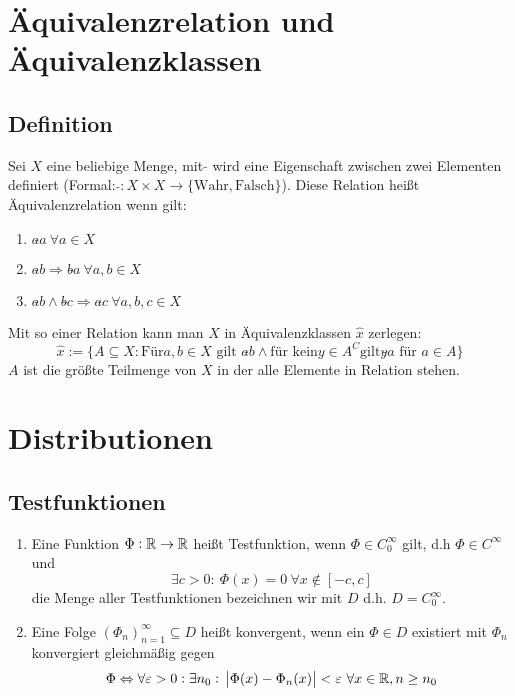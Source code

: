 \section{Äquivalenzrelation und Äquivalenzklassen}
\subsection{Definition}
Sei $X$ eine beliebige Menge, mit $\tilde{}$ wird eine Eigenschaft zwischen zwei
Elementen definiert (Formal: $\tilde{}: X \times X \to \{\text{Wahr}, \text{Falsch}\}$).
Diese Relation heißt Äquivalenzrelation wenn gilt:
\begin{enumerate}
    \item $a \tilde{} a \ \forall a \in X$ 
    \item $a \tilde{} b \Rightarrow b \tilde{} a\ \forall a,b \in X$
    \item $a \tilde{} b \land b \tilde{} c \Rightarrow a \tilde{} c\ \forall a,b,c \in X$
\end{enumerate}
Mit so einer Relation kann man $X$ in Äquivalenzklassen $\hat{x}$ zerlegen:
\begin{equation*}
    \hat{x} := \{A \subseteq X: \text{Für} a,b \in X \text{ gilt } a \tilde{} b \land \text{für kein} y \in A^C  \text{gilt} y \tilde{} a \text{ für } a \in A\}
\end{equation*}
$A$ ist die größte Teilmenge von $X$ in der alle Elemente in Relation stehen.

\section{Distributionen}
\subsection{Testfunktionen}
\begin{enumerate}
    \item Eine Funktion $\Phi: \mathbb{R} \to \mathbb{R}$ heißt Testfunktion, wenn $\Phi \in C_0^\infty$ gilt, d.h $\Phi \in C^\infty$
        und
        \begin{equation*}
            \exists c > 0:\ \Phi(x)=0\ \forall x \notin [-c, c]
        \end{equation*}
        die Menge aller Testfunktionen bezeichnen wir mit $D$ d.h. $D = C_0^\infty$.
    \item Eine Folge ${(\Phi_n)}_{n=1}^\infty \subseteq D$ heißt konvergent, wenn ein $\Phi \in D$ existiert mit
        $\Phi_n$ konvergiert gleichmäßig gegen
        \begin{equation*}
            \Phi \Leftrightarrow \forall \varepsilon > 0: \exists n_0:\ \abs{\Phi(x) - \Phi_n(x)} < \varepsilon\ 
            \forall x \in \R, n \geq n_0
        \end{equation*}
\end{enumerate}

